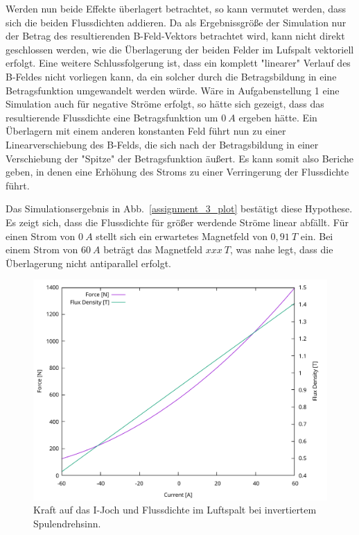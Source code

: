 \documentclass[conference,a4paper,twoside]{IEEEtran}
\begin{document}
Werden nun beide Effekte überlagert betrachtet, so kann vermutet werden, dass sich die beiden Flussdichten addieren. Da als Ergebnissgröße der Simulation nur der Betrag des resultierenden B-Feld-Vektors betrachtet wird, kann nicht direkt geschlossen werden, wie die Überlagerung der beiden Felder im Lufspalt vektoriell erfolgt. Eine weitere Schlussfolgerung ist, dass ein komplett "linearer" Verlauf des B-Feldes nicht vorliegen kann, da ein solcher durch die Betragsbildung in eine Betragsfunktion umgewandelt werden würde. Wäre in Aufgabenstellung 1 eine Simulation auch für negative Ströme erfolgt, so hätte sich gezeigt, dass das resultierende Flussdichte eine Betragsfunktion um $0\ A$ ergeben hätte. Ein Überlagern mit einem anderen konstanten Feld führt nun zu einer Linearverschiebung des B-Felds, die sich nach der Betragsbildung in einer Verschiebung der "Spitze" der Betragsfunktion äußert. Es kann somit also Beriche geben, in denen eine Erhöhung des Stroms zu einer Verringerung der Flussdichte führt.

Das Simulationsergebnis in Abb.~\ref{assignment_3_plot} bestätigt diese Hypothese. Es zeigt sich, dass die Flussdichte für größer werdende Ströme linear abfällt. Für einen Strom von $0\ A$ stellt sich ein erwartetes Magnetfeld von $0,91\ T$ ein. Bei einem Strom von $60\ A$ beträgt das Magnetfeld $xxx\ T$, was nahe legt, dass die Überlagerung nicht antiparallel erfolgt.

\begin{figure}
\centerline{\includegraphics[width=\columnwidth]{../assets/assignment_3_plot_swapped_polarity.pdf}}
\caption{Kraft auf das I-Joch und Flussdichte im Luftspalt bei invertiertem Spulendrehsinn.}
\label{assignment_3_plot_swapped_polarity}
\end{figure}
\end{document}
